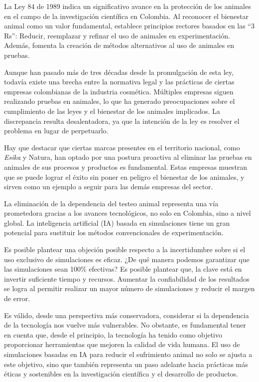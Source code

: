 \documentclass[letterpaper, 12pt]{report}
\begin{document}
La Ley 84 de 1989 indica un significativo avance en la protección de
los animales en el campo de la investigación científica en Colombia.
Al reconocer el bienestar animal como un valor fundamental, establece
principios rectores basados en las ``3 Rs'': Reducir, reemplazar y refinar
el uso de animales en experimentación. Además, fomenta la creación de
métodos alternativos al uso de animales en pruebas.

Aunque han pasado más de tres décadas desde la promulgación de esta ley,
todavía existe una brecha entre la normativa legal y las prácticas de
ciertas empresas colombianas de la industria cosmética. Múltiples empresas
siguen realizando pruebas en animales, lo que ha generado preocupaciones
sobre el cumplimiento de las leyes y el bienestar de los animales implicados.
La discrepancia resulta desalentadora, ya que la intención de la ley es
resolver el problema en lugar de perpetuarlo.

Hay que destacar que ciertas marcas presentes en el territorio nacional, como
\textit{Esika} y Natura, han optado por una postura proactiva al eliminar las pruebas
en animales de sus procesos y productos es fundamental. Estas empresas
muestran que se puede lograr el éxito sin poner en peligro el bienestar de
los animales, y sirven como un ejemplo a seguir para las demás empresas del
sector.

La eliminación de la dependencia del testeo animal representa una vía
prometedora gracias a los avances tecnológicos, no solo en Colombia, sino
a nivel global. La inteligencia artificial (IA) basada en simulaciones tiene
un gran potencial para sustituir los métodos convencionales de experimentación.

Es posible plantear una objeción posible respecto a la incertidumbre sobre
si el uso exclusivo de simulaciones es eficaz. ¿De qué manera podemos
garantizar que las simulaciones sean 100\% efectivas? Es posible plantear
que, la clave está en invertir suficiente tiempo y recursos. Aumentar la
confiabilidad de los resultados se logra al permitir realizar un mayor
número de simulaciones y reducir el margen de error.

Es válido, desde una perspectiva más conservadora, considerar si la
dependencia de la tecnología nos vuelve más vulnerables. No obstante, es
fundamental tener en cuenta que, desde el principio, la tecnología ha tenido
como objetivo proporcionar herramientas que mejoren la calidad de vida
humana. El uso de simulaciones basadas en IA para reducir el sufrimiento
animal no solo se ajusta a este objetivo, sino que también representa un
paso adelante hacia prácticas más éticas y sostenibles en la investigación
científica y el desarrollo de productos.
\end{document}
